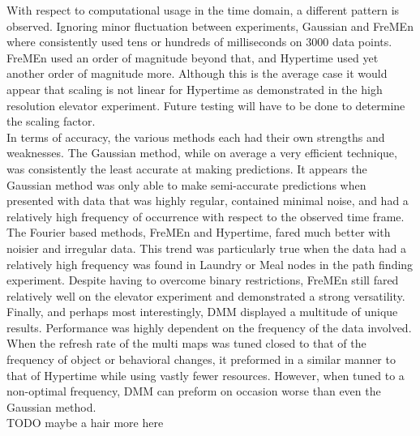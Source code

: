 With respect to computational usage in the time domain, a different pattern is
observed. Ignoring minor fluctuation between experiments, Gaussian and FreMEn
where consistently used tens or hundreds of milliseconds on 3000 data points.
FreMEn used an order of magnitude beyond that, and Hypertime used yet another
order of magnitude more. Although this is the average case it would appear that
scaling is not linear for Hypertime as demonstrated in the high resolution
elevator experiment. Future testing will have to be done to determine the
scaling factor. \\

In terms of accuracy, the various methods each had their own strengths and
weaknesses. The Gaussian method, while on average a very efficient
technique, was consistently the least accurate at making predictions. It appears the
Gaussian method was only able to make semi-accurate predictions when presented
with data that was highly regular, contained minimal noise, and had a
relatively high frequency of occurrence with respect to the observed time
frame. \\

The Fourier based methods, FreMEn and Hypertime, fared much better
with noisier and irregular data. This trend was particularly true when the data
had a relatively high frequency was found in Laundry or Meal nodes in the
path finding experiment. Despite having to overcome binary restrictions, FreMEn
still fared relatively well on the elevator experiment and demonstrated a strong
versatility. Finally, and perhaps most interestingly, DMM
displayed a multitude of unique results. Performance was highly dependent
on the frequency of the data involved. When the refresh rate of the multi maps
was tuned closed to that of the frequency of object or behavioral changes, it
preformed in a similar manner to that of Hypertime while using vastly fewer
resources. However, when tuned to a non-optimal frequency, DMM can preform
on occasion worse than even the Gaussian method. \\ TODO maybe a hair more here


